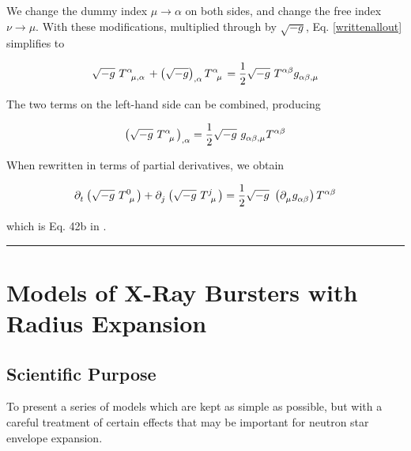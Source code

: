 \documentclass[onecolumn]{aastex63}
\begin{document}
We change the dummy index $\mu \rightarrow \alpha$ on both sides, and change the free index $\nu \rightarrow \mu$. With these modifications, multiplied through by $\sqrt{-g}$,  Eq. \ref{writtenallout} simplifies to 

\begin{equation} \label{writtenallout_simplified}
    \sqrt{-g}\ T\indices{^\alpha _{\mu, \alpha}} + \left(\sqrt{-g}\right)\indices{_{, \alpha}} T\indices{^\alpha _\mu} = \frac{1}{2} \sqrt{-g}\ T\indices{^\alpha ^\beta} g\indices{_{\alpha \beta , \mu}}
\end{equation}

The two terms on the left-hand side can be combined, producing

\begin{equation} \label{writtenallout_simplified}
    \left(\sqrt{-g}\ T\indices{^\alpha _\mu}\right)\indices{_{, \alpha}}  = \frac{1}{2} \sqrt{-g}\ g\indices{_{\alpha \beta , \mu}} T\indices{^\alpha ^\beta} 
\end{equation}

When rewritten in terms of partial derivatives, we obtain 

\begin{equation} \label{writtenallout_simplified}
    \partial\indices{_t}\left(\sqrt{-g}\ T\indices{^0 _\mu}\right) +  \partial\indices{_j}\left(\sqrt{-g}\ T\indices{^j _\mu}\right)= \frac{1}{2} \sqrt{-g}\ \left(\partial\indices{_\mu} g\indices{_{\alpha \beta}}\right)T\indices{^\alpha ^\beta} 
\end{equation}

which is Eq. 42b in \cite{stone2020}.

\vspace{1cm}
\hrule
\vspace{1cm}

\section{Models of X-Ray Bursters with Radius Expansion}

\begin{centering}

\cite{paczynski1983}

\end{centering} 


\subsection{Scientific Purpose}
To present a series of models which are kept as simple as possible, but with a careful treatment of certain effects that may be important for neutron star envelope expansion.
\end{document}
